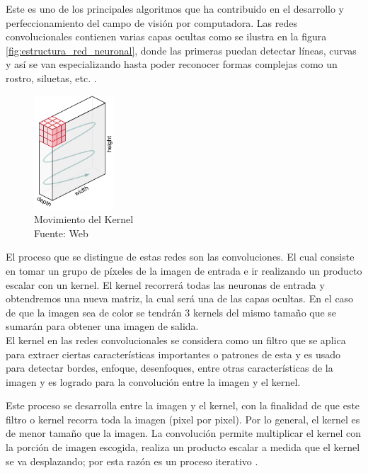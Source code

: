 Este es uno de los principales algoritmos que ha contribuido en el desarrollo y perfeccionamiento del campo de visión por computadora. Las redes convolucionales contienen varias capas ocultas como se ilustra en la figura \ref{fig:estructura_red_neuronal}, donde las primeras puedan detectar líneas, curvas y así se van especializando hasta poder reconocer formas complejas como un rostro, siluetas, etc. \cite{convolutional:ia}. \\

\begin{figure}[H]
    \begin{center}
        \includegraphics[width=3cm]{img/capitulo_2/kernel.png}
    \end{center}
    \caption{Movimiento del Kernel
        \\Fuente: Web}
    \label{fig:kernel}
\end{figure}

El proceso que se distingue de estas redes son las convoluciones. El cual consiste en tomar un grupo de píxeles de la imagen de entrada e ir realizando un producto escalar con un kernel. El kernel recorrerá todas las neuronas de entrada y obtendremos una nueva matriz, la cual será una de las capas ocultas. En el caso de que la imagen sea de color se tendrán 3 kernels del mismo tamaño que se sumarán para obtener una imagen de salida.\\

El kernel en las redes convolucionales se considera como un filtro que se aplica para extraer ciertas características importantes o patrones de esta y es usado para detectar bordes, enfoque, desenfoques, entre otras características de la imagen y es logrado para la convolución entre la imagen y el kernel.

Este proceso se desarrolla entre la imagen y el kernel, con la finalidad de que este filtro o kernel recorra toda la imagen (pixel por pixel). Por lo general, el kernel es de menor tamaño que la imagen. La convolución permite multiplicar el kernel con la porción de imagen escogida, realiza un producto escalar a medida que el kernel se va desplazando; por esta razón es un proceso iterativo .\\

